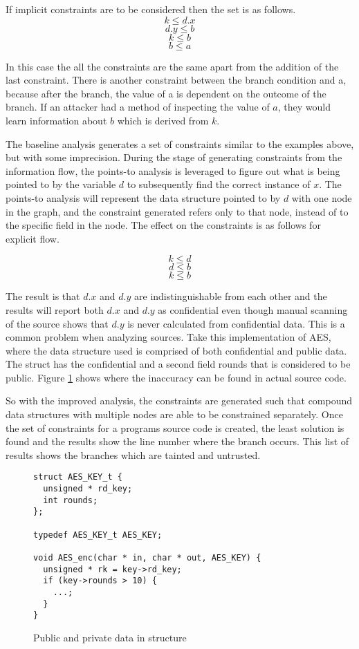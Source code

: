 If implicit constraints are to be considered then the set is as follows.
\[
  k \leq d.x
\]
\[
  d.y \leq b
\]
\[
  k \leq b
\]
\[
  b \leq a
\]

In this case the all the constraints are the same apart from the addition of the
last constraint. There is another constraint between the branch condition and a,
because after the branch, the value of a is dependent on the outcome of the
branch. If an attacker had a method of inspecting the value of $a$, they would
learn information about $b$ which is derived from $k$.

The baseline analysis generates a set of constraints similar to the examples
above, but with some imprecision. During the stage of generating constraints
from the information flow, the points-to analysis is leveraged to figure out
what is being pointed to by the variable $d$ to subsequently find the correct
instance of $x$. The points-to analysis will represent the data structure
pointed to by $d$ with one node in the graph, and the constraint generated
refers only to that node, instead of to the specific field in the node. The
effect on the constraints is as follows for explicit flow.

\[
  k \leq d
\]
\[
  d \leq b
\]
\[
  k \leq b
\]

The result is that $d.x$ and $d.y$ are indistinguishable from each other and the
results will report both $d.x$ and $d.y$ as confidential even though manual
scanning of the source shows that $d.y$ is never calculated from confidential
data. This is a common problem when analyzing sources. Take this implementation
of AES, where the data structure used is comprised of both confidential and
public data. The  struct has the confidential  and a second field
rounds that is considered to be public. Figure \ref{alg:aesstruct} shows
where the inaccuracy can be found in actual source code.

So with the improved analysis, the constraints are generated such that compound
data structures with multiple nodes are able to be constrained separately. Once
the set of constraints for a programs source code is created, the least solution
is found and the results show the line number where the branch occurs. This list
of results shows the branches which are tainted and untrusted. 

\begin{figure}[h!]
\begin{lstlisting}
struct AES_KEY_t {
  unsigned * rd_key;
  int rounds;
};

typedef AES_KEY_t AES_KEY;

void AES_enc(char * in, char * out, AES_KEY) {
  unsigned * rk = key->rd_key;
  if (key->rounds > 10) {
    ...;
  }
}
\end{lstlisting}
\caption{Public and private data in structure}
\label{alg:aesstruct}
\end{figure}

